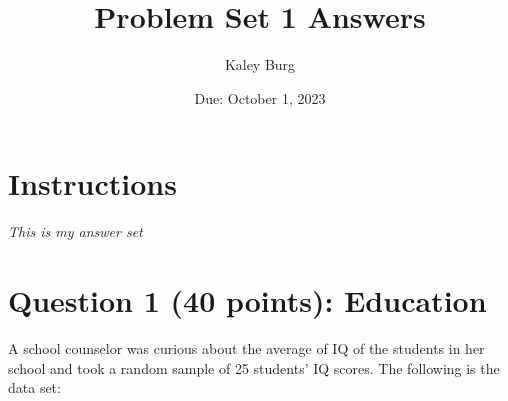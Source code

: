 \documentclass[12pt,letterpaper]{article}
\title{Problem Set 1 Answers}
\date{Due: October 1, 2023}
\author{Kaley Burg}
\begin{document}
	\maketitle
	
	\section*{Instructions}
\textit{This is my answer set}
	
	\vspace{1cm}
	\section*{Question 1 (40 points): Education}

A school counselor was curious about the average of IQ of the students in her school and took a random sample of 25 students' IQ scores. The following is the data set:\\
\vspace{.5cm}

  

\vspace{1cm}
\end{document}
